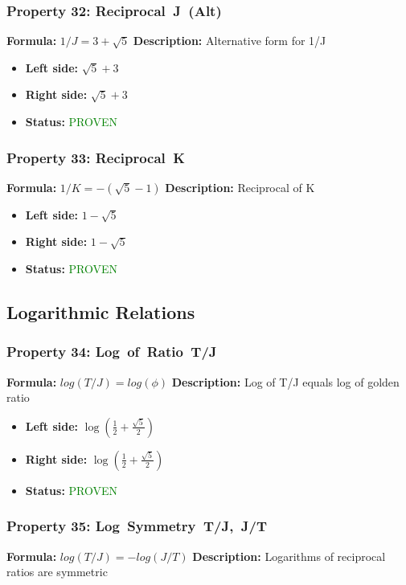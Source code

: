 \subsubsection*{Property 32: Reciprocal~J~(Alt)}
\textbf{Formula:} $1/J = 3 + \sqrt{5}$
\textbf{Description:} Alternative form for 1/J

\begin{itemize}
\item \textbf{Left side:} $\sqrt{5} + 3$
\item \textbf{Right side:} $\sqrt{5} + 3$
\item \textbf{Status:} \textcolor{green}{PROVEN}
\end{itemize}

\subsubsection*{Property 33: Reciprocal~K}
\textbf{Formula:} $1/K = -(\sqrt{5}-1)$
\textbf{Description:} Reciprocal of K

\begin{itemize}
\item \textbf{Left side:} $1 - \sqrt{5}$
\item \textbf{Right side:} $1 - \sqrt{5}$
\item \textbf{Status:} \textcolor{green}{PROVEN}
\end{itemize}


\subsection{Logarithmic Relations}

\subsubsection*{Property 34: Log~of~Ratio~T/J}
\textbf{Formula:} $log(T/J) = log(\phi)$
\textbf{Description:} Log of T/J equals log of golden ratio

\begin{itemize}
\item \textbf{Left side:} $\log{\left(\frac{1}{2} + \frac{\sqrt{5}}{2} \right)}$
\item \textbf{Right side:} $\log{\left(\frac{1}{2} + \frac{\sqrt{5}}{2} \right)}$
\item \textbf{Status:} \textcolor{green}{PROVEN}
\end{itemize}

\subsubsection*{Property 35: Log~Symmetry~T/J,~J/T}
\textbf{Formula:} $log(T/J) = -log(J/T)$
\textbf{Description:} Logarithms of reciprocal ratios are symmetric

